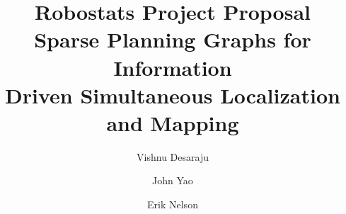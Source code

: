 \documentclass[]{article}
\begin{document}
\title{Robostats Project Proposal \\ Sparse Planning Graphs for Information \\ Driven Simultaneous Localization and Mapping}
\author{Vishnu Desaraju}
\author{John Yao}
\author{Erik Nelson}

\maketitle






\end{document}
